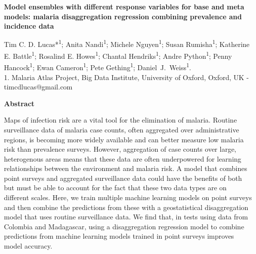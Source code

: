 \documentclass[11pt]{article}
\begin{document}
\templatefigures{}



\small{

\begin{center}
\textbf{Model ensembles with different response variables for base and meta models: malaria disaggregation regression combining prevalence and incidence data}
\end{center}



\begin{center}
{Tim C. D. Lucas*\textsuperscript{1}; Anita Nandi\textsuperscript{1}; Michele Nguyen\textsuperscript{1}; 
Susan Rumisha\textsuperscript{1}; 
Katherine E. Battle\textsuperscript{1}; Rosalind E. Howes\textsuperscript{1}; 
Chantal Hendriks\textsuperscript{1}; Andre Python\textsuperscript{1}; Penny Hancock\textsuperscript{1}; 
Ewan Cameron\textsuperscript{1}; Pete Gething\textsuperscript{1}; Daniel~J.~Weiss\textsuperscript{1}.}\\
{1. Malaria Atlas Project, Big Data Institute, University of Oxford, Oxford, UK - timcdlucas@gmail.com}\\ 


\end{center}

\begin{center}
{\bf Abstract}
\end{center}

\setlength{\parindent}{0pt}


Maps of infection risk are a vital tool for the elimination of malaria.
Routine surveillance data of malaria case counts, often aggregated over administrative regions, is becoming more widely available and can better measure low malaria risk than prevalence surveys.
However, aggregation of case counts over large, heterogenous areas means that these data are often underpowered for learning relationships between the environment and malaria risk.
A model that combines point surveys and aggregated surveillance data could have the benefits of both but must be able to account for the fact that these two data types are on different scales.
Here, we train multiple machine learning models on point surveys and then combine the predictions from these with a geostatistical disaggregation model that uses routine surveillance data.
We find that, in tests using data from Colombia and Madagascar, using a disaggregation regression model to combine predictions from machine learning models trained in point surveys improves model accuracy.

}
\end{document}

